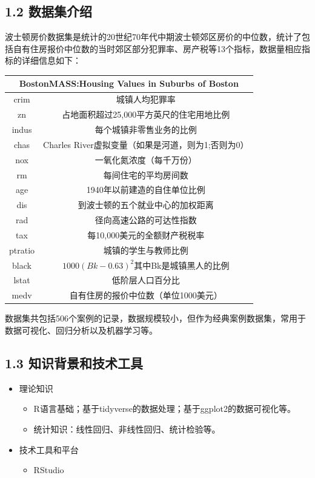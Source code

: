 \documentclass[UTF-8]{ctexart}
\begin{document}
	\subsection{1.2 数据集介绍}
	波士顿房价数据集是统计的20世纪70年代中期波士顿郊区房价的中位数，统计了包括自有住房报价中位数的当时郊区部分犯罪率、房产税等13个指标，数据量相应指标的详细信息如下：
	\begin{center}
		\begin{tabular}{|c|c|} 
			\hline 
			\multicolumn{2}{|c|}{Boston{MASS}:Housing Values in Suburbs of Boston} \\ 
			\hline 
			crim&城镇人均犯罪率\\
			zn &占地面积超过25,000平方英尺的住宅用地比例\\
			indus &每个城镇非零售业务的比例\\
			chas & Charles River虚拟变量（如果是河道，则为1;否则为0）\\
			nox & 一氧化氮浓度（每千万份）\\
			rm & 每间住宅的平均房间数 \\
			age & 1940年以前建造的自住单位比例 \\
			dis & 到波士顿的五个就业中心的加权距离 \\
			rad & 径向高速公路的可达性指数 \\
			tax & 每10,000美元的全额财产税税率 \\
			ptratio & 城镇的学生与教师比例 \\
			black & $1000(Bk- 0.63)^{2}$其中Bk是城镇黑人的比例 \\
			lstat & 低阶层人口百分比 \\
			medv & 自有住房的报价中位数（单位1000美元） \\
			\hline 
		\end{tabular}
	\end{center}

	数据集共包括506个案例的记录，数据规模较小，但作为经典案例数据集，常用于数据可视化、回归分析以及机器学习等。

	\subsection{1.3 知识背景和技术工具}
	\begin{itemize}
		\item 理论知识 \begin{itemize}
			\item R语言基础；基于tidyverse的数据处理；基于ggplot2的数据可视化等。
			\item 统计知识：线性回归、非线性回归、统计检验等。
		\end{itemize}
		\item 技术工具和平台 \begin{itemize}
			\item RStudio
		\end{itemize}
	\end{itemize}
	
\end{document}
